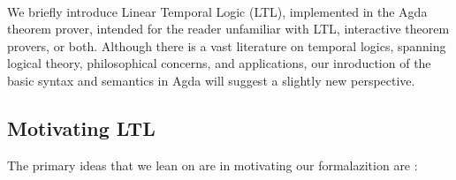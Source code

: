 \documentclass{article}
\begin{document}
\begin{code}[hide]
\AgdaSpace{}%
\<%
\\
\>[0]\AgdaSpace{}%
\AgdaSpace{}%
\AgdaSpace{}%
\AgdaSpace{}%
\AgdaSymbol{(}\AgdaSpace{}%
\AgdaSpace{}%
\AgdaSymbol{)}\<%
\\
\>[0]\AgdaSpace{}%
\AgdaSpace{}%
\<%
\\
\>[0]\AgdaSpace{}%
\AgdaSpace{}%
\AgdaSpace{}%
\AgdaSpace{}%
\AgdaSymbol{(}\AgdaSymbol{;}\AgdaSpace{}%
\AgdaSymbol{;}\AgdaSpace{}%
\AgdaOperator{\AgdaInductiveConstructor{\AgdaUnderscore{},\AgdaUnderscore{}}}\AgdaSymbol{;}\AgdaSpace{}%
\AgdaSymbol{;}\AgdaSpace{}%
\AgdaSymbol{;}\AgdaSpace{}%
\AgdaSymbol{;}\AgdaSpace{}%
\AgdaSymbol{;}\AgdaSpace{}%
\AgdaSymbol{)}\<%
\\
\>[0]\AgdaSpace{}%
\AgdaSpace{}%
\<%
\\
%
\\[\AgdaEmptyExtraSkip]%
\>[0]\AgdaSpace{}%
\AgdaSpace{}%
\AgdaSymbol{(}\AgdaSpace{}%
\AgdaSymbol{:}\AgdaSpace{}%
\AgdaSymbol{)}\AgdaSpace{}%
\<%
\end{code}

We briefly introduce Linear Temporal Logic (LTL), implemented in the Agda
theorem prover, intended for the reader unfamiliar with LTL, interactive theorem
provers, or both. Although there is a vast literature on temporal logics,
spanning logical theory, philosophical concerns, and applications, our
inroduction of the basic syntax and semantics in Agda will suggest a slightly
new perspective.

\subsection{Motivating LTL}

The primary ideas that we lean on are in motivating our formalazition are :
\end{document}
